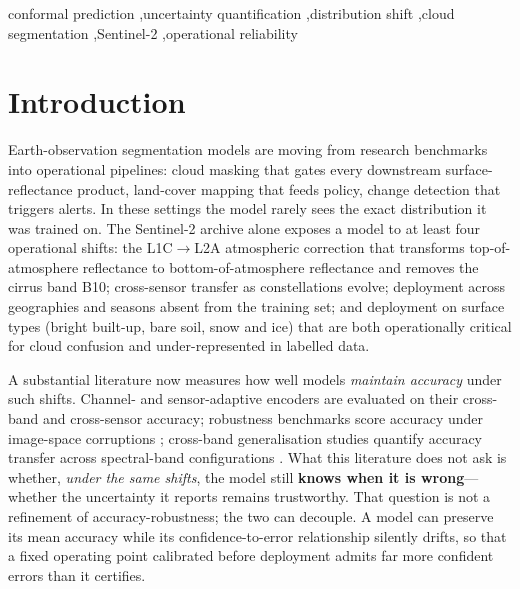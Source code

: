 \documentclass[preprint,3p,times]{elsarticle}
\begin{document}
\begin{frontmatter}
\begin{abstract}
optical segmentation under a real atmospheric-correction shift, traced to a stale preprocessing contract rather than to atmospheric physics alone.
\end{abstract}

\begin{keyword}
conformal prediction \sep uncertainty quantification \sep distribution shift \sep cloud segmentation \sep Sentinel-2 \sep operational reliability
\end{keyword}

\end{frontmatter}

\section{Introduction}
Earth-observation segmentation models are moving from research benchmarks into operational pipelines: cloud masking that gates every downstream surface-reflectance product, land-cover mapping that feeds policy, change detection that triggers alerts. In these settings the model rarely sees the exact distribution it was trained on. The Sentinel-2 archive alone exposes a model to at least four operational shifts: the L1C$\to$L2A atmospheric correction that transforms top-of-atmosphere reflectance to bottom-of-atmosphere reflectance and removes the cirrus band B10; cross-sensor transfer as constellations evolve; deployment across geographies and seasons absent from the training set; and deployment on surface types (bright built-up, bare soil, snow and ice) that are both operationally critical for cloud confusion and under-represented in labelled data.

A substantial literature now measures how well models \emph{maintain accuracy} under such shifts. Channel- and sensor-adaptive encoders \citep{xiong2024dofa,waldmann2025panopticon,francis2021sensei,bao2024channelvit} are evaluated on their cross-band and cross-sensor accuracy; robustness benchmarks score accuracy under image-space corruptions \citep{li2025reobench}; cross-band generalisation studies quantify accuracy transfer across spectral-band configurations \citep{tamazyan2025geocrossbench}. What this literature does not ask is whether, \emph{under the same shifts}, the model still \textbf{knows when it is wrong}---whether the uncertainty it reports remains trustworthy. That question is not a refinement of accuracy-robustness; the two can decouple. A model can preserve its mean accuracy while its confidence-to-error relationship silently drifts, so that a fixed operating point calibrated before deployment admits far more confident errors than it certifies.
\end{document}
